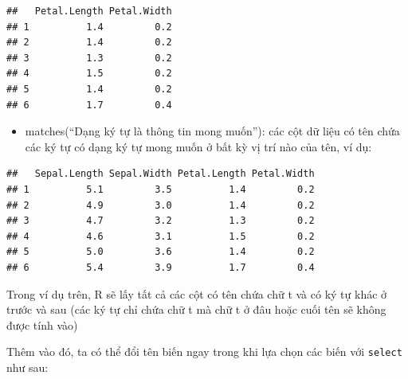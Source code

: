 \documentclass[]{krantz}
\makeatletter
\newenvironment{Shaded}{\begin{snugshade}}{\end{snugshade}}
\newcommand{\DataTypeTok}[1]{\textcolor[rgb]{0.27,0.27,0.27}{#1}}
\newcommand{\KeywordTok}[1]{\textcolor[rgb]{0.27,0.27,0.27}{\textbf{#1}}}
\newcommand{\NormalTok}[1]{#1}
\newcommand{\OperatorTok}[1]{\textcolor[rgb]{0.43,0.43,0.43}{\textbf{#1}}}
\newcommand{\StringTok}[1]{\textcolor[rgb]{0.5,0.5,0.5}{#1}}
\providecommand{\tightlist}{%
  \setlength{\itemsep}{0pt}\setlength{\parskip}{0pt}}
\newenvironment{kframe}{%
\medskip{}
\setlength{\fboxsep}{.8em}
 \def\at@end@of@kframe{}%
 \ifinner\ifhmode%
  \def\at@end@of@kframe{\end{minipage}}%
  \begin{minipage}{\columnwidth}%
 \fi\fi%
 \def\FrameCommand##1{\hskip\@totalleftmargin \hskip-\fboxsep
 \colorbox{shadecolor}{##1}\hskip-\fboxsep
     \hskip-\linewidth \hskip-\@totalleftmargin \hskip\columnwidth}%
 \MakeFramed {\advance\hsize-\width
   \@totalleftmargin\z@ \linewidth\hsize
   \@setminipage}}%
 {\par\unskip\endMakeFramed%
 \at@end@of@kframe}
\renewenvironment{Shaded}{\begin{kframe}}{\end{kframe}}
\renewenvironment{Shaded}{\begin{snugshade}}{\end{snugshade}}
\renewcommand{\DataTypeTok}[1]{\textcolor[rgb]{0.13,0.29,0.53}{#1}}
\renewcommand{\KeywordTok}[1]{\textcolor[rgb]{0.13,0.29,0.53}{\textbf{#1}}}
\renewcommand{\NormalTok}[1]{#1}
\renewcommand{\OperatorTok}[1]{\textcolor[rgb]{0.81,0.36,0.00}{\textbf{#1}}}
\renewcommand{\StringTok}[1]{\textcolor[rgb]{0.31,0.60,0.02}{#1}}
\theoremstyle{definition}
\theoremstyle{definition}
\theoremstyle{definition}
\theoremstyle{remark}
\makeatother
\begin{document}
\begin{verbatim}
##   Petal.Length Petal.Width
## 1          1.4         0.2
## 2          1.4         0.2
## 3          1.3         0.2
## 4          1.5         0.2
## 5          1.4         0.2
## 6          1.7         0.4
\end{verbatim}

\begin{itemize}
\tightlist
\item
  matches(``Dạng ký tự là thông tin mong muốn''): các cột dữ liệu có tên
  chứa các ký tự có dạng ký tự mong muốn ở bất kỳ vị trí nào của tên, ví
  dụ:
\end{itemize}

\begin{Shaded}
\end{Shaded}

\begin{verbatim}
##   Sepal.Length Sepal.Width Petal.Length Petal.Width
## 1          5.1         3.5          1.4         0.2
## 2          4.9         3.0          1.4         0.2
## 3          4.7         3.2          1.3         0.2
## 4          4.6         3.1          1.5         0.2
## 5          5.0         3.6          1.4         0.2
## 6          5.4         3.9          1.7         0.4
\end{verbatim}

Trong ví dụ trên, R sẽ lấy tất cả các cột có tên chứa chữ t và có ký tự
khác ở trước và sau (các ký tự chỉ chứa chữ t mà chữ t ở đâu hoặc cuối
tên sẽ không được tính vào)

Thêm vào đó, ta có thể đổi tên biến ngay trong khi lựa chọn các biến với
\texttt{select} như sau:

\begin{Shaded}
\end{Shaded}
\end{document}
